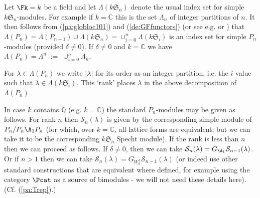 \documentclass[reqno,10pt,a4paper]{amsart}
\newcommand{\C}{\mathbb{C}}
\newcommand{\QQ}{\mathbb{Q}}  %
\newcommand{\Sym}{\mathfrak{S}}
\newcommand{\cell}{\mathcal{S}}
\newcommand{\SSS}{\mathcal{S}} %
\newcommand{\confer}[1]{$\;$(Cf. (#1).)}  %
\begin{document}
\mdef  \label{pa:globloc102}
Let $\Fk = k$ be a field 
and let  $ \Lambda(k\Sym_n) $ denote the usual index set for simple $k \Sym_n$-modules. 
For example 
if $k=\C$ this is the set $\Lambda_n$ of integer partitions of $n$. 
It 
then
follows 
from (\ref{pa:globloc101}) and (\ref{de:GFfunctors}) 
(or see e.g. \cite{Martin94} or \cite[(4.1)]{amm2019tonal}) that
$\Lambda(P_n) 
= \Lambda(P_{n-1} )  \cup \Lambda(k \Sym_n)
= \cup_{i=0}^n \Lambda(k \Sym_i)
$
is an index set for simple $P_n$-modules
(provided $\delta \neq 0$). 
If $\delta \neq 0$ and  $k=\C$ we have $\Lambda(P_n) =\Lambda^n \; := \; \cup_{i=0}^n \Lambda_n$.

For $\lambda \in \Lambda(P_n)$ we write $|\lambda|$ for its 
order as an integer partition, i.e. the $i$ value such that     $\lambda \in  \Lambda(k \Sym_i)$.
This `rank' places $\lambda$ in the above decomposition of $\Lambda(P_n)$. 

\newcommand{\GA}{G_\A}  %

In case $k$ contains $\QQ$ (e.g. $k=\C$)  
the standard $P_n$-modules may be given as follows. 
For rank $n$ then $\SSS_n(\lambda)$ is 
given by 
the corresponding simple module of $P_n/P_n \A_1 P_n$
(for which, over $k=\C$, all lattice forms are equivalent; but we can take it to be the corresponding $k \Sym_n$ Specht module).
If the rank is less than $n$ then we can proceed as follows.
If $\delta\neq 0$,
then we can take 
$\SSS_n(\lambda)  = G_{\A_1} \SSS_{n-1}(\lambda)$.
Or if $n>1$ then we can take 
$\SSS_n(\lambda)  = G_{W^1_b} \SSS_{n-1}(\lambda)$
(or indeed use other standard constructions that are equivalent where defined, for example using the category $\Pcat$ as a source of bimodules - we will not need these details here).
$\;$
\confer{\ref{pa:Trep}}
\end{document}
